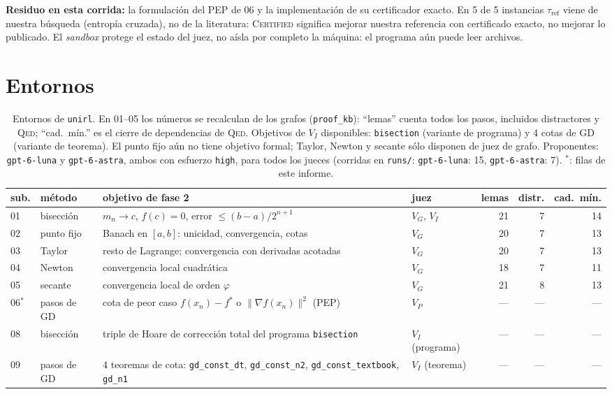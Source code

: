 \documentclass[11pt,a4paper]{article}
\begin{document}
\textbf{Residuo en esta corrida:} la formulación del PEP de 06 y la implementación de su certificador exacto. En 5 de 5 instancias $\tau_{\mathrm{ref}}$ viene de nuestra búsqueda (entropía cruzada), no de la literatura: \textsc{Certified} significa mejorar nuestra referencia con certificado exacto, no mejorar lo publicado. El \emph{sandbox} protege el estado del juez, no aísla por completo la máquina: el programa aún puede leer archivos.

\section{Entornos}

\begin{table}[!ht]
\centering
\footnotesize
\begin{tabular}{@{}llp{5.0cm}lrrr@{}}
\toprule
sub. & método & objetivo de fase 2 & juez & lemas & distr. & cad.\ mín. \\
\midrule
01 & bisección & $m_n \to c$, $f(c)=0$, error $\le (b-a)/2^{n+1}$ & $V_G$, $V_I$ & 21 & 7 & 14 \\
02 & punto fijo & Banach en $[a,b]$: unicidad, convergencia, cotas & $V_G$ & 20 & 7 & 13 \\
03 & Taylor & resto de Lagrange; convergencia con derivadas acotadas & $V_G$ & 20 & 7 & 13 \\
04 & Newton & convergencia local cuadrática & $V_G$ & 18 & 7 & 11 \\
05 & secante & convergencia local de orden $\varphi$ & $V_G$ & 21 & 8 & 13 \\
06$^\ast$ & pasos de GD & cota de peor caso $f(x_n)-f^*$ o $\|\nabla f(x_n)\|^2$ (PEP) & $V_P$ & --- & --- & --- \\
08 & bisección & triple de Hoare de corrección total del programa \texttt{bisection} & $V_I$ (programa) & --- & --- & --- \\
09 & pasos de GD & 4 teoremas de cota: \texttt{gd\_\allowbreak{}const\_\allowbreak{}dt}, \texttt{gd\_\allowbreak{}const\_\allowbreak{}n2}, \texttt{gd\_\allowbreak{}const\_\allowbreak{}textbook}, \texttt{gd\_\allowbreak{}n1} & $V_I$ (teorema) & --- & --- & --- \\
\bottomrule
\end{tabular}
\caption{Entornos de \texttt{unirl}. En 01--05 los números se recalculan de los grafos (\texttt{proof\_kb}): ``lemas'' cuenta todos los pasos, incluidos distractores y \textsc{Qed}; ``cad.\ mín.'' es el cierre de dependencias de \textsc{Qed}. Objetivos de $V_I$ disponibles: \texttt{bisection} (variante de programa) y 4 cotas de GD (variante de teorema). El punto fijo aún no tiene objetivo formal; Taylor, Newton y secante sólo disponen de juez de grafo. Proponentes: \texttt{gpt-6-luna} y \texttt{gpt-6-astra}, ambos con esfuerzo \texttt{high}, para todos los jueces (corridas en \texttt{runs/}: \texttt{gpt-\allowbreak{}6-\allowbreak{}luna}: 15, \texttt{gpt-\allowbreak{}6-\allowbreak{}astra}: 7). $^\ast$: filas de este informe.}
\label{tab:envs}
\end{table}
\end{document}
